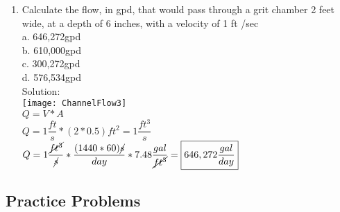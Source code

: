 \documentclass{article}
\begin{document}
\begin{enumerate}
\item Calculate the flow, in gpd, that would pass through a grit chamber 2 feet wide, at a depth of 6 inches, with a velocity of 1 ft /sec\\
a. 646,272gpd \\
b. 610,000gpd \\
c. 300,272gpd \\
d. 576,534gpd \\
Solution:\\
\texttt{[image: ChannelFlow3]}\\
$Q=V*A$\\
$Q=1\dfrac{ft}{s}*(2*0.5)ft^2=1\dfrac{ft^3}{s}$\\
$Q=1\dfrac{\cancel{ft^3}}{\cancel{s}}*\dfrac{(1440*60)\cancel{s}}{day}*7.48\dfrac{gal}{\cancel{ft^3}}=\boxed{646,272\dfrac{gal}{day}}$
\end{enumerate}



\subsection{Practice Problems} 
\end{document}
